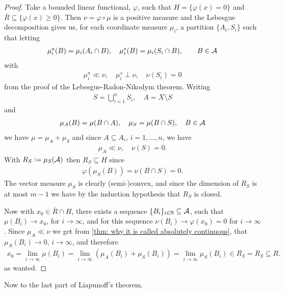 \begin{proof}
Take a bounded linear functional, $\varphi$, such that $H=\{\varphi(x)=0\}$ and $\overline{R}\subseteq \{ \varphi(x) \ge 0\}$. Then $\nu=\varphi\circ \mu$ is a positive measure %
and the Lebesgue decomposition gives us, for each coordinate measure $\mu_{i}$, a partition $\{A_{i}, S_{i}\}$ such that letting
\begin{align*}
	\mu_{i}^{a}(B)=\mu_{i}(A_{i}\cap B), \quad \mu_{i}^{s}(B)=\mu_{i}(S_{i}\cap B), \qquad B\in \mathcal{A}
\end{align*}
with
\begin{align*}
	\mu_{i}^{a} \ll \nu, \quad \mu_{i}^{s} \perp \nu, \quad \nu(S_{i})=0
\end{align*}
from the proof of the Lebesgue-Radon-Nikodym theorem.
Writing
\begin{align*}
	S=\bigcup_{i=1}^{n}S_{i}, \quad A=X\setminus S
\end{align*}
and
\begin{align*}
	\mu_{A}(B)=\mu(B\cap A), \quad \mu_{S}=\mu(B\cap S), \quad B\in \mathcal{A}
\end{align*}
we have $\mu=\mu_{A}+\mu_{S}$ and since $A\subseteq A_{i}$, $i=1,\dots, n$, we have
\begin{align*}
	\mu_{A} \ll \nu, \quad \nu(S)=0.
\end{align*}
With $R_{S}:=\mu_{S}(\mathcal{A})$ then $R_{S}\subseteq H$ since
\begin{align*}
	\varphi(\mu_{S}(B)) = \nu(B\cap S) = 0.
\end{align*}
The vector measure $\mu_{S}$ is clearly (semi-)convex, and since the dimension of $R_{S}$ is at most $m-1$ we have by the induction hypothesis that $R_{S}$ is closed.

Now with $x_{0}\in \overline{R}\cap H$, there exists a sequence $\{B_{i}\}_{i\in \mathbb{N}}\subseteq \mathcal{A}$, such that $\mu(B_{i})\to x_{0}$, for $i\to \infty$, and for this sequence $\nu(B_{i})\to \varphi(x_{0})=0$ for $i\to \infty$. Since $\mu_{A} \ll \nu$ we get from \cref{thm: why it is called absolutely continuous},
that $\mu_{A}(B_{i})\to 0$, $i\to \infty$, and therefore
\begin{align*}
	x_{0}=\lim_{i\to \infty} \mu(B_{i})=\lim_{i\to \infty} (\mu_{A}(B_{i}) + \mu_{S}(B_{i})) = \lim_{i\to \infty} \mu_{S}(B_{i}) \in \overline{R_{S}}=R_{S}\subseteq R.
\end{align*}
as wanted.
\end{proof}


Now to the last part of Liapunoff's theorem.

